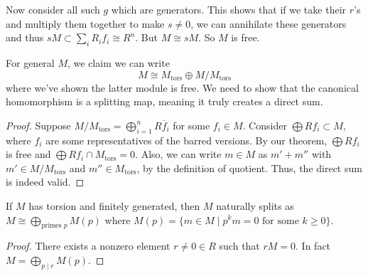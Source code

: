 Now consider all such $g$ which are generators. This shows that if we take their $r$'s and multiply them together to make $s \neq 0$,
we can annihilate these generators and thus $sM \subset \sum_i R_i f_i \cong R^n$. But $M \cong sM$. So $M$ is free.

For general $M$, we claim we can write \[ M \cong M_{\text{tors}} \oplus M/M_{\text{tors}} \]
where we've shown the latter module is free.
We need to show that the canonical homomorphism is a splitting map, meaning
it truly creates a direct sum.
\begin{proof}
    Suppose $M/M_{\text{tors}} = \bigoplus_{i = 1}^n R \overline{f}_i$ for some $f_i \in M$. Consider $\bigoplus R f_i \subset M$,
    where $f_i$ are some representatives of the barred versions.
    By our theorem, $\bigoplus R f_i$ is free and $\bigoplus R f_i \cap M_{\text{tors}} = 0$. Also, we can write $m \in M$ as $m' + m''$ with $m' \in M/M_{\text{tors}}$ and $m'' \in M_{\text{tors}}$,
    by the definition of quotient. Thus, the direct sum is indeed valid.
\end{proof}
\begin{theorem}
    If $M$ has torsion and finitely generated, then $M$ naturally splits as $M \cong \bigoplus_{\text{primes }p} M(p)$
    where $M(p) = \{m \in M \mid p^k m = 0 \text{ for some $k \geq 0$}\}$.
    \begin{proof}
        There exists a nonzero element $r \neq 0 \in R$ such that $rM = 0$. In fact $M = \bigoplus_{p \mid r} M(p)$.
    \end{proof}
\end{theorem}